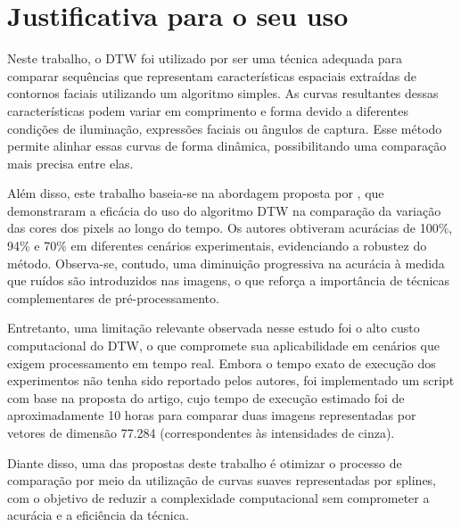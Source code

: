 \section{Justificativa para o seu uso}

Neste trabalho, o DTW foi utilizado por ser uma técnica adequada para comparar sequências que representam características espaciais extraídas de contornos faciais utilizando um algoritmo simples. As curvas resultantes dessas características podem variar em comprimento e forma devido a diferentes condições de iluminação, expressões faciais ou ângulos de captura. Esse método permite alinhar essas curvas de forma dinâmica, possibilitando uma comparação mais precisa entre elas.

Além disso, este trabalho baseia-se na abordagem proposta por \citet{DTW_LSTM}, que demonstraram a eficácia do uso do algoritmo DTW na comparação da variação das cores dos pixels ao longo do tempo. Os autores obtiveram acurácias de 100\%, 94\% e 70\% em diferentes cenários experimentais, evidenciando a robustez do método. Observa-se, contudo, uma diminuição progressiva na acurácia à medida que ruídos são introduzidos nas imagens, o que reforça a importância de técnicas complementares de pré-processamento.


Entretanto, uma limitação relevante observada nesse estudo foi o alto custo computacional do DTW, o que compromete sua aplicabilidade em cenários que exigem processamento em tempo real. Embora o tempo exato de execução dos experimentos não tenha sido reportado pelos autores, foi implementado um script com base na proposta do artigo, cujo tempo de execução estimado foi de aproximadamente 10 horas para comparar duas imagens representadas por vetores de dimensão 77.284 (correspondentes às intensidades de cinza).

Diante disso, uma das propostas deste trabalho é otimizar o processo de comparação por meio da utilização de curvas suaves representadas por splines, com o objetivo de reduzir a complexidade computacional sem comprometer a acurácia e a eficiência da técnica.

